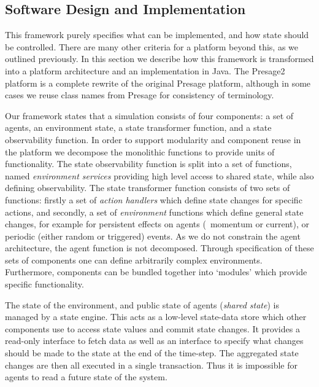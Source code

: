 
\subsection{Software Design and Implementation}

This framework purely specifies what can be implemented, and how state should
be controlled. There are many other criteria for a platform beyond this, as we
outlined previously. In this section we describe how this framework is
transformed into a platform architecture and an implementation in Java.  The
Presage2 platform is a complete rewrite of the original Presage platform,
although in some cases we reuse class names from Presage for consistency of
terminology.

Our framework states that a simulation consists of four components: a set of
agents, an environment state, a state transformer function, and a state
observability function.  In order to support modularity and component reuse in
the platform we decompose the monolithic functions to provide units of
functionality. The state observability function is split into a set of
functions, named \emph{environment services} providing high level access to
shared state, while also defining observability. The state transformer
function consists of two sets of functions: firstly a set of \emph{action
handlers} which define state changes for specific actions, and secondly, a set
of \emph{environment} functions which define general state changes, for
example for persistent effects on agents (\eg\ momentum or current), or periodic
(either random or triggered) events.  As we do not constrain the agent
architecture, the agent function is not decomposed. Through specification of
these sets of components one can define arbitrarily complex environments.
Furthermore, components can be bundled together into `modules' which provide
specific functionality.

The state of the environment, and public state of agents (\emph{shared state})
is managed by a state engine. This acts as a low-level state-data store which
other components use to access state values and commit state changes. It
provides a read-only interface to fetch data as well as an interface to
specify what changes should be made to the state at the end of the time-step.
The aggregated state changes are then all executed in a single transaction.
Thus it is impossible for agents to read a future state of the system.

